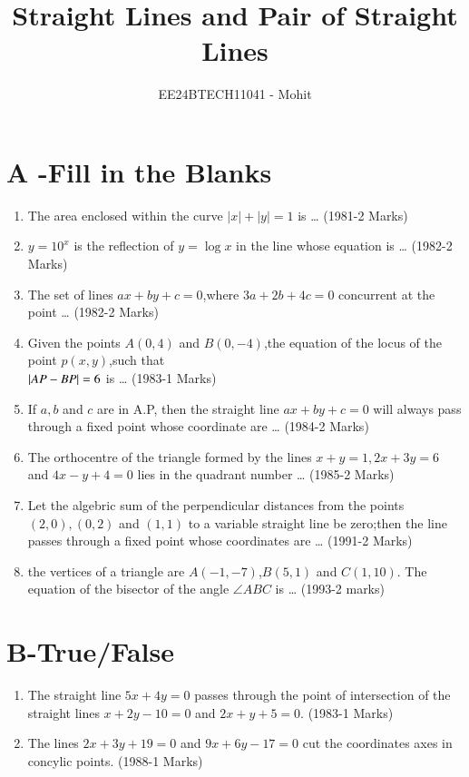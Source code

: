 \documentclass[journal,12pt,twocolumn]{IEEEtran}
\theoremstyle{remark}
\begin{document}

\vspace{3cm}

\title{Straight Lines and Pair of Straight Lines}
\author{EE24BTECH11041 - Mohit}
\maketitle
\newpage
\bigskip

\renewcommand{\thefigure}{\theenumi}
\renewcommand{\thetable}{\theenumi}

\section {A -Fill in the Blanks}
\begin{enumerate}
    \item The area enclosed within the curve $|x|+|y| =1$ is \dots
    \hfill(1981-2 Marks)
    \item $y = 10^x $ is the reflection of $y=\log x$ in the  line whose equation is \dots
    \hfill(1982-2 Marks)
    \item The set of lines $ax+by+c=0$,where $3a+2b+4c=0$ concurrent at the point \dots
    \hfill(1982-2 Marks)
    \item Given the points $A(0,4)$ and $B(0,-4)$,the equation of the locus of the point $p(x,y)$,such that \\
    $\left\vert AP-BP\right\vert=6$ is \dots
    \hfill(1983-1 Marks)
    \item If $a,b$ and $c$ are in A.P, then the straight line $ax +by +c=0$ will always pass through a fixed point whose coordinate are \dots
    \hfill(1984-2 Marks)
    \item The orthocentre of the triangle formed by the lines $x+y=1,2x +3y=6$ and $4x-y+4=0$ lies in the quadrant number \dots
    \hfill(1985-2 Marks)
    \item Let the algebric sum of the perpendicular distances from the points $(2,0),(0,2)$ and $(1,1)$ to a variable straight line be zero;then the line passes through a fixed point whose coordinates are \dots
    \hfill(1991-2 Marks)
    \item the vertices of a triangle are $A(-1,-7)$,$B(5,1)$ and $C(1,10)$. The equation of the bisector of the angle $\angle{ABC}$ is \dots
    \hfill(1993-2 marks)
\end{enumerate}
\section {B-True/False}
\begin{enumerate}
    \item The straight line $5x+4y=0$ passes through the point of intersection of the straight lines $x+2y-10=0$ and $2x+y+5=0$.
    \hfill(1983-1 Marks)
    \item The lines $2x+3y+19=0$ and $9x+6y-17=0$ cut the coordinates axes in concylic points.
    \hfill(1988-1 Marks)
\end{enumerate}
\end{document}
